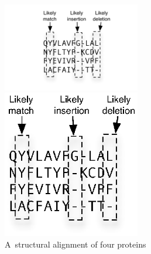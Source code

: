 \documentclass[preprint,nonatbib,blockstyle,nocopyrightspace,times]{sigplanconf}
\begin{document}
\begin{figure}
\ifpdfmadness
\centerline{\includegraphics[width=6cm]{alignment.pdf}} 
\else
\centerline{\includegraphics[width=6cm]{alignment.eps}} 
\fi



\caption{A~structural alignment of four proteins}
\label{alignment} 
\end{figure}
\end{document}
